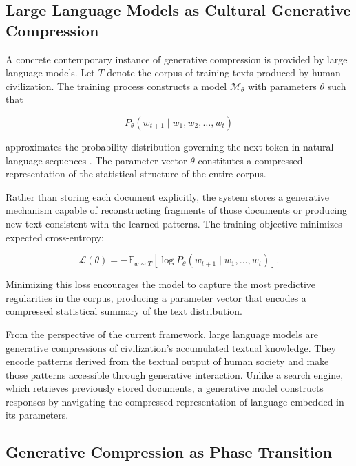 \documentclass[12pt,a4paper]{article}
\theoremstyle{plain}
\theoremstyle{definition}
\begin{document}
\subsection{Large Language Models as Cultural Generative Compression}

A concrete contemporary instance of generative compression is provided by large language models. Let $T$ denote the corpus of training texts produced by human civilization. The training process constructs a model $\mathcal{M}_\theta$ with parameters $\theta$ such that

\begin{equation}
P_\theta(w_{t+1} \mid w_1, w_2, \ldots, w_t)
\end{equation}

approximates the probability distribution governing the next token in natural language sequences \cite{Vaswani2017}. The parameter vector $\theta$ constitutes a compressed representation of the statistical structure of the entire corpus.

Rather than storing each document explicitly, the system stores a generative mechanism capable of reconstructing fragments of those documents or producing new text consistent with the learned patterns. The training objective minimizes expected cross-entropy:

\begin{equation}
\mathcal{L}(\theta) = -\mathbb{E}_{w \sim T}\!\left[\log P_\theta(w_{t+1} \mid w_1, \ldots, w_t)\right].
\end{equation}

Minimizing this loss encourages the model to capture the most predictive regularities in the corpus, producing a parameter vector that encodes a compressed statistical summary of the text distribution.

From the perspective of the current framework, large language models are generative compressions of civilization's accumulated textual knowledge. They encode patterns derived from the textual output of human society and make those patterns accessible through generative interaction. Unlike a search engine, which retrieves previously stored documents, a generative model constructs responses by navigating the compressed representation of language embedded in its parameters.

\subsection{Generative Compression as Phase Transition}
\end{document}
